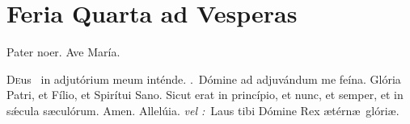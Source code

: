 \documentclass[12pt]{article} %
\newenvironment{response}{\leftskip 0in \setlength{\parindent}{0in}}{\vspace{1 mm}}
\def\vel{\textit{\textcolor{benred8}{vel :}}}
\let\oldRbar\Rbar
\renewcommand{\Rbar}{\textcolor{benred8}{\oldRbar .}}
\let\oldAbar\Abar
\renewcommand{\Abar}{\textcolor{benred8}{\oldAbar .}}
\let\oldgrealtcross\grealtcross
\renewcommand{\grealtcross}{\textcolor{benred8}{\oldgrealtcross}}
\begin{document}

\newpage


\section*{Feria Quarta ad Vesperas}

\begin{center}Pater noer. Ave Mar\'{i}a.\end{center}

\thispagestyle{plain}

\begin{response}\lettrine{D}{e}us \grealtcross\ in adjut\'{o}rium meum int\'{e}nde. \Rbar\ D\'{o}mine ad adjuv\'{a}ndum me fe\'{i}na. Gl\'{o}ria Patri, et F\'{i}lio, et Spir\'{i}tui Sano. Sicut erat in princ\'{i}pio, et nunc, et semper, et in s\'{\ae}cula s\ae cul\'{o}rum. Amen. Allel\'{u}ia. \vel\ Laus tibi D\'{o}mine Rex \ae t\'{e}rn\ae\ gl\'{o}ri\ae .

\end{response}


\subsection*{}



\def\greinitialformat#1{%
{\fontsize{60}{60}\selectfont #1}%
}

\gresetfirstlineaboveinitial{\small \textsc{ \textbf{\textcolor{benred8}{1 \Abar\ II D}}}}{}%

\def\greinitialformat#1{%
{\fontsize{43}{43}\selectfont #1}%
}
\end{document}
